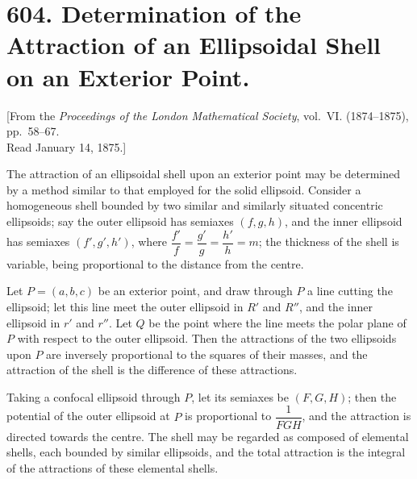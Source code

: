 \documentclass[11pt,a4paper]{book}
\begin{document}
\newpage
\section[Determination of the Attraction of an Ellipsoidal Shell on an Exterior Point]%
{604. Determination of the Attraction of an Ellipsoidal Shell on an Exterior Point.}

\begin{center}
{\small [From the \textit{Proceedings of the London Mathematical Society}, vol.~VI. (1874--1875), pp.~58--67.\\
Read January 14, 1875.]}
\end{center}

\begin{art}
The attraction of an ellipsoidal shell upon an exterior point may be determined by a method similar to that employed for the solid ellipsoid. Consider a homogeneous shell bounded by two similar and similarly situated concentric ellipsoids; say the outer ellipsoid has semiaxes $(f, g, h)$, and the inner ellipsoid has semiaxes $(f', g', h')$, where $\dfrac{f'}{f} = \dfrac{g'}{g} = \dfrac{h'}{h} = m$; the thickness of the shell is variable, being proportional to the distance from the centre.
\end{art}

\begin{art}
Let $P = (a, b, c)$ be an exterior point, and draw through $P$ a line cutting the ellipsoid; let this line meet the outer ellipsoid in $R'$ and $R''$, and the inner ellipsoid in $r'$ and $r''$. Let $Q$ be the point where the line meets the polar plane of $P$ with respect to the outer ellipsoid. Then the attractions of the two ellipsoids upon $P$ are inversely proportional to the squares of their masses, and the attraction of the shell is the difference of these attractions.
\end{art}

\begin{art}
Taking a confocal ellipsoid through $P$, let its semiaxes be $(F, G, H)$; then the potential of the outer ellipsoid at $P$ is proportional to $\dfrac{1}{F G H}$, and the attraction is directed towards the centre. The shell may be regarded as composed of elemental shells, each bounded by similar ellipsoids, and the total attraction is the integral of the attractions of these elemental shells.
\end{art}
\end{document}

